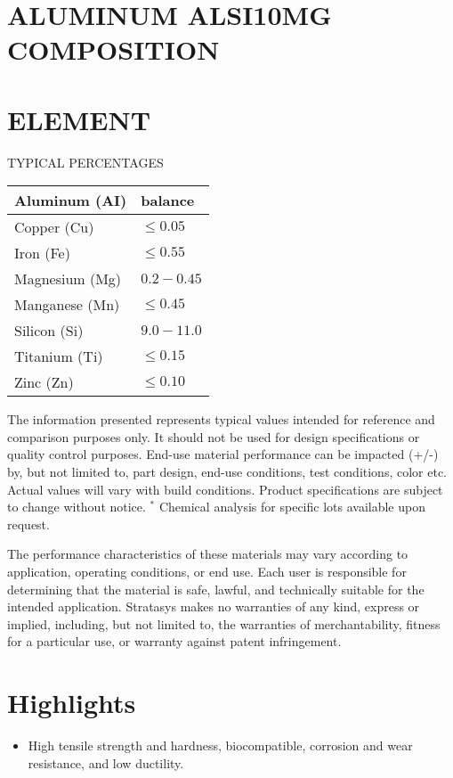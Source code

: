 \documentclass[10pt]{article}
\begin{document}
\section*{ALUMINUM ALSI10MG COMPOSITION}
\section*{ELEMENT}
TYPICAL PERCENTAGES

\begin{center}
\begin{tabular}{|l|l|}
\hline
Aluminum (AI) & balance \\
\hline
Copper (Cu) & $\leq 0.05$ \\
\hline
Iron (Fe) & $\leq 0.55$ \\
\hline
Magnesium (Mg) & $0.2-0.45$ \\
\hline
Manganese (Mn) & $\leq 0.45$ \\
\hline
Silicon (Si) & $9.0-11.0$ \\
\hline
Titanium (Ti) & $\leq 0.15$ \\
\hline
Zinc (Zn) & $\leq 0.10$ \\
\hline
\end{tabular}
\end{center}

The information presented represents typical values intended for reference and comparison purposes only. It should not be used for design specifications or quality control purposes. End-use material performance can be impacted (+/-) by, but not limited to, part design, end-use conditions, test conditions, color etc. Actual values will vary with build conditions. Product specifications are subject to change without notice. ${ }^{*}$ Chemical analysis for specific lots available upon request.

The performance characteristics of these materials may vary according to application, operating conditions, or end use. Each user is responsible for determining that the material is safe, lawful, and technically suitable for the intended application. Stratasys makes no warranties of any kind, express or implied, including, but not limited to, the warranties of merchantability, fitness for a particular use, or warranty against patent infringement.

\section*{Highlights}
\begin{itemize}
  \item High tensile strength and hardness, biocompatible, corrosion and wear resistance, and low ductility.
\end{itemize}
\end{document}
